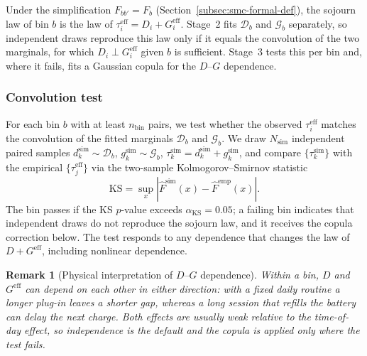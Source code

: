 \documentclass[journal]{IEEEtran}
\newtheorem{remark}{Remark}
\begin{document}
Under the simplification $F_{bb'} = F_b$ (Section~\ref{subsec:smc-formal-def}), the sojourn law of bin $b$ is the law of $\tau_i^{\mathrm{eff}} = D_i + G_i^{\mathrm{eff}}$. Stage~2 fits $\mathcal{D}_b$ and $\mathcal{G}_b$ separately, so independent draws reproduce this law only if it equals the convolution of the two marginals, for which $D_i \perp G_i^{\mathrm{eff}}$ given $b$ is sufficient. Stage~3 tests this per bin and, where it fails, fits a Gaussian copula for the $D$--$G$ dependence.






\subsubsection{Convolution test}

For each bin $b$ with at least $n_{\mathrm{bin}}$ pairs, we test whether the observed $\tau_i^{\mathrm{eff}}$ matches the convolution of the fitted marginals $\mathcal{D}_b$ and $\mathcal{G}_b$. We draw $N_{\mathrm{sim}}$ independent paired samples $d_k^{\mathrm{sim}} \sim \mathcal{D}_b$, $g_k^{\mathrm{sim}} \sim \mathcal{G}_b$, $\tau_k^{\mathrm{sim}} = d_k^{\mathrm{sim}} + g_k^{\mathrm{sim}}$, and compare $\{\tau_k^{\mathrm{sim}}\}$ with the empirical $\{\tau_j^{\mathrm{eff}}\}$ via the two-sample Kolmogorov--Smirnov statistic
\begin{equation}
    \mathrm{KS} = \sup_x \left| \hat{F}^{\mathrm{sim}}(x) - \hat{F}^{\mathrm{emp}}(x) \right|.
    \label{eq:ks-statistic}
\end{equation}
The bin passes if the KS $p$-value exceeds $\alpha_{\mathrm{KS}} = 0.05$; a failing bin indicates that independent draws do not reproduce the sojourn law, and it receives the copula correction below. The test responds to any dependence that changes the law of $D + G^{\mathrm{eff}}$, including nonlinear dependence.

\begin{remark}[Physical interpretation of $D$--$G$ dependence]
\label{rem:dg-correlation}
Within a bin, $D$ and $G^{\mathrm{eff}}$ can depend on each other in either direction: with a fixed daily routine a longer plug-in leaves a shorter gap, whereas a long session that refills the battery can delay the next charge. Both effects are usually weak relative to the time-of-day effect, so independence is the default and the copula is applied only where the test fails.
\end{remark}
\end{document}
